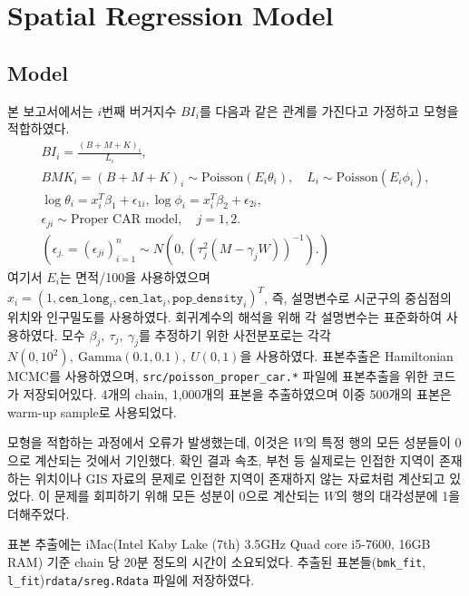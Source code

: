 \documentclass{scrartcl}
\begin{document}
\section{Spatial Regression Model}\label{sec:sreg}

\subsection{Model}\label{subsec:sreg:model}

본 보고서에서는 $i$번째 버거지수 $BI_i$를 다음과 같은 관계를 가진다고 가정하고 모형을 적합하였다.
\begin{equation}\label{eqn:sreg}
    \begin{gathered}
    BI_i = \frac{(B+M+K)_i}{L_i},\\
    BMK_i = (B+M+K)_i \sim \textrm{Poisson}(E_i \theta_i), \quad L_i \sim \textrm{Poisson}(E_i \phi_i), \\
    \log \theta_i = x_i^T \beta_1 + \epsilon_{1i}, \log \phi_i = x_i^T \beta_2 + \epsilon_{2i}, \\
    \epsilon_{ji} \sim \textrm{Proper CAR model}, \quad j=1,2. \\
    (\epsilon_{j.} = (\epsilon_{ji})_{i=1}^n \sim N(0,(\tau_j^2 (M-\gamma_j W))^{-1} ).)
    \end{gathered}
\end{equation}
여기서 $E_i$는 면적/100을 사용하였으며 $x_i = (1, \texttt{cen\_long}_i, \texttt{cen\_lat}_i, \texttt{pop\_density}_i)^T$, 즉, 설명변수로 시군구의 중심점의 위치와 인구밀도를 사용하였다. 회귀계수의 해석을 위해 각 설명변수는 표준화하여 사용하였다. 모수 $\beta_j,~\tau_j,~\gamma_j$를 추정하기 위한 사전분포로는 각각 $N(0, 10^2),~\textrm{Gamma}(0.1, 0.1),~U(0,1)$을 사용하였다. 표본추출은 Hamiltonian MCMC를 사용하였으며, \texttt{src/poisson\_proper\_car.*} 파일에 표본추출을 위한 코드가 저장되어있다. 4개의 chain, 1,000개의 표본을 추출하였으며 이중 500개의 표본은 warm-up sample로 사용되었다. 

모형을 적합하는 과정에서 오류가 발생했는데, 이것은 $W$의 특정 행의 모든 성분들이 0으로 계산되는 것에서 기인했다. 확인 결과 속초, 부천 등 실제로는 인접한 지역이 존재하는 위치이나 GIS 자료의 문제로 인접한 지역이 존재하지 않는 자료처럼 계산되고 있었다. 이 문제를 회피하기 위해 모든 성분이 0으로 계산되는 $W$의 행의 대각성분에 1을 더해주었다.

표본 추출에는 iMac(Intel Kaby Lake (7th) 3.5GHz Quad core i5-7600, 16GB RAM) 기준 chain 당 20분 정도의 시간이 소요되었다. 추출된 표본들(\texttt{bmk\_fit}, \texttt{l\_fit})\을 \texttt{rdata/sreg.Rdata} 파일에 저장하였다.
\end{document}
